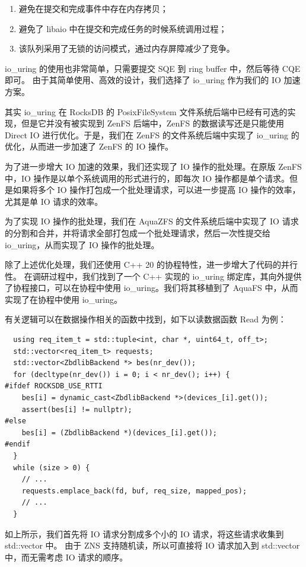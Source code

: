 \begin{enumerate}
  \item 避免在提交和完成事件中存在内存拷贝；
  \item 避免了 libaio 中在提交和完成任务的时候系统调用过程；
  \item 该队列采用了无锁的访问模式，通过内存屏障减少了竞争。
\end{enumerate}

io\_uring 的使用也非常简单，只需要提交 SQE 到 ring buffer 中，然后等待 CQE 即可。
由于其简单使用、高效的设计，我们选择了 io\_uring 作为我们的 IO 加速方案。

其实 io\_uring 在 RocksDB 的 PosixFileSystem 文件系统后端中已经有可选的实现，但是它并没有被实现到 ZenFS 后端中，ZenFS 的数据读写还是只能使用 Direct IO 进行优化。于是，我们在 ZenFS 的文件系统后端中实现了 io\_uring 的优化，从而进一步加速了 ZenFS 的 IO 操作。

为了进一步增大 IO 加速的效果，我们还实现了 IO 操作的批处理。在原版 ZenFS 中，IO 操作是以单个系统调用的形式进行的，即每次 IO 操作都是单个请求。但是如果将多个 IO 操作打包成一个批处理请求，可以进一步提高 IO 操作的效率，尤其是单 IO 请求的效率。

为了实现 IO 操作的批处理，我们在 AquaZFS 的文件系统后端中实现了 IO 请求的分割和合并，并将请求全部打包成一个批处理请求，然后一次性提交给 io\_uring，从而实现了 IO 操作的批处理。

除了上述优化处理，我们还使用 C++ 20 的协程特性，进一步增大了代码的并行性。
在调研过程中，我们找到了一个 C++ 实现的 io\_uring 绑定库，其向外提供了协程接口，可以在协程中使用 io\_uring。我们将其移植到了 AquaFS 中，从而实现了在协程中使用 io\_uring。

有关逻辑可以在数据操作相关的函数中找到，如下以读数据函数 Read 为例：

\begin{lstlisting}
  using req_item_t = std::tuple<int, char *, uint64_t, off_t>;
  std::vector<req_item_t> requests;
  std::vector<ZbdlibBackend *> bes(nr_dev());
  for (decltype(nr_dev()) i = 0; i < nr_dev(); i++) {
#ifdef ROCKSDB_USE_RTTI
    bes[i] = dynamic_cast<ZbdlibBackend *>(devices_[i].get());
    assert(bes[i] != nullptr);
#else
    bes[i] = (ZbdlibBackend *)(devices_[i].get());
#endif
  }
  while (size > 0) {
    // ...
    requests.emplace_back(fd, buf, req_size, mapped_pos);
    // ...
  }
\end{lstlisting}

如上所示，我们首先将 IO 请求分割成多个小的 IO 请求，将这些请求收集到 std::vector 中。
由于 ZNS 支持随机读，所以可直接将 IO 请求加入到 std::vector 中，而无需考虑 IO 请求的顺序。

